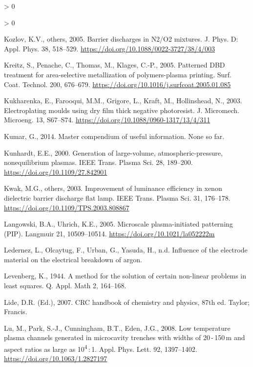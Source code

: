 \documentclass[
  11pt,
  twoside]{article}
\newlength{\cslhangindent}
\newenvironment{CSLReferences}[2] %
 {%
  \setlength{\parindent}{0pt}
  \ifodd #1 \everypar{\setlength{\hangindent}{\cslhangindent}}\ignorespaces\fi
  \ifnum #2 > 0
  \setlength{\parskip}{#2\baselineskip}
  \fi
 }%
 {}
\begin{document}
\begin{CSLReferences}{1}{0}
\begin{CSLReferences}{1}{0}
\leavevmode\hypertarget{ref-Kozl05}{}%
Kozlov, K.V., others, 2005. Barrier discharges in {N2/O}2 mixtures. J. Phys. D: Appl. Phys. 38, 518--529. \url{https://doi.org/10.1088/0022-3727/38/4/003}

\leavevmode\hypertarget{ref-Krei05}{}%
Kreitz, S., Penache, C., Thomas, M., Klages, C.-P., 2005. Patterned {DBD} treatment for area-selective metallization of polymers-plasma printing. Surf. Coat. Technol. 200, 676--679. \url{https://doi.org/10.1016/j.surfcoat.2005.01.085}

\leavevmode\hypertarget{ref-Kukh03}{}%
Kukharenka, E., Farooqui, M.M., Grigore, L., Kraft, M., Hollinshead, N., 2003. Electroplating moulds using dry film thick negative photoresist. J. Micromech. Microeng. 13, S67--S74. \url{https://doi.org/10.1088/0960-1317/13/4/311}

\leavevmode\hypertarget{ref-gopal2014}{}%
Kumar, G., 2014. Master compendium of useful information. None so far.

\leavevmode\hypertarget{ref-Kunh00}{}%
Kunhardt, E.E., 2000. Generation of large-volume, atmospheric-pressure, nonequilibrium plasmas. IEEE Trans. Plasma Sci. 28, 189--200. \url{https://doi.org/10.1109/27.842901}

\leavevmode\hypertarget{ref-Kwak03}{}%
Kwak, M.G., others, 2003. Improvement of luminance efficiency in xenon dielectric barrier discharge flat lamp. IEEE Trans. Plasma Sci. 31, 176--178. \url{https://doi.org/10.1109/TPS.2003.808867}

\leavevmode\hypertarget{ref-Lang05}{}%
Langowski, B.A., Uhrich, K.E., 2005. Microscale plasma-initiated patterning ({PIP}). Langmuir 21, 10509--10514. \url{https://doi.org/10.1021/la052222m}

\leavevmode\hypertarget{ref-Lede08}{}%
Ledernez, L., Olcaytug, F., Urban, G., Yasuda, H., n.d. Influence of the electrode material on the electrical breakdown of argon.

\leavevmode\hypertarget{ref-Leve1944}{}%
Levenberg, K., 1944. A method for the solution of certain non-linear problems in least squares. Q. Appl. Math 2, 164--168.

\leavevmode\hypertarget{ref-CRC07}{}%
Lide, D.R. (Ed.), 2007. CRC handbook of chemistry and physics, 87th ed. Taylor; Francis.

\leavevmode\hypertarget{ref-Lu08}{}%
Lu, M., Park, S.-J., Cunningham, B.T., Eden, J.G., 2008. Low temperature plasma channels generated in microcavity trenches with widths of 20 - 150 {}m and aspect ratios as large as 10\textsuperscript{4} : 1. Appl. Phys. Lett. 92, 1397--1402. \url{https://doi.org/10.1063/1.2827197}


\end{CSLReferences}
\end{CSLReferences}
\end{document}
